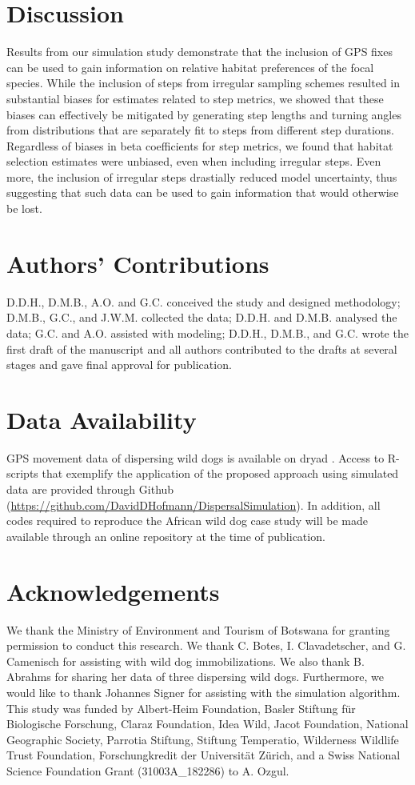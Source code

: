 \documentclass[abstract=on,10pt,a4paper,bibliography=totocnumbered]{article}
\begin{document}
\section{Discussion}
Results from our simulation study demonstrate that the inclusion of GPS fixes
can be used to gain information on relative habitat preferences of the focal
species. While the inclusion of steps from irregular sampling schemes resulted
in substantial biases for estimates related to step metrics, we showed that
these biases can effectively be mitigated by generating step lengths and turning
angles from distributions that are separately fit to steps from different step
durations. Regardless of biases in beta coefficients for step metrics, we found
that habitat selection estimates were unbiased, even when including irregular
steps. Even more, the inclusion of irregular steps drastially reduced model
uncertainty, thus suggesting that such data can be used to gain information that
would otherwise be lost.

\section{Authors' Contributions}
D.D.H., D.M.B., A.O. and G.C. conceived the study and designed methodology;
D.M.B., G.C., and J.W.M. collected the data; D.D.H. and D.M.B. analysed the
data; G.C. and A.O. assisted with modeling; D.D.H., D.M.B., and G.C. wrote the
first draft of the manuscript and all authors contributed to the drafts at
several stages and gave final approval for publication.

\section{Data Availability}
GPS movement data of dispersing wild dogs is available on dryad
\citep{Hofmann.2021b}. Access to R-scripts that exemplify the application of the
proposed approach using simulated data are provided through Github
(\url{https://github.com/DavidDHofmann/DispersalSimulation}). In addition, all
codes required to reproduce the African wild dog case study will be made
available through an online repository at the time of publication.

\section{Acknowledgements}
We thank the Ministry of Environment and Tourism of Botswana for granting
permission to conduct this research. We thank C. Botes, I. Clavadetscher, and G.
Camenisch for assisting with wild dog immobilizations. We also thank B. Abrahms
for sharing her data of three dispersing wild dogs. Furthermore, we would like
to thank Johannes Signer for assisting with the simulation algorithm. This study
was funded by Albert-Heim Foundation, Basler Stiftung für Biologische Forschung,
Claraz Foundation, Idea Wild, Jacot Foundation, National Geographic Society,
Parrotia Stiftung, Stiftung Temperatio, Wilderness Wildlife Trust Foundation,
Forschungkredit der Universität Zürich, and a Swiss National Science Foundation
Grant (31003A\_182286) to A. Ozgul.

\newpage
\begingroup
\singlespacing

\endgroup
\end{document}
